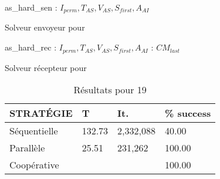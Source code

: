 \begin{algorithm}[!h]
\dontprintsemicolon
\SetNoline
{}
   as\_hard\_sen\;
\algoindent{} : $I_{perm}, T_{AS}, V_{AS}, S_{first}, A_{AI}$ \;
\caption{Solveur envoyeur pour \CARRP}\label{res_as:costas_sender}
\end{algorithm}

\begin{algorithm}[!h]
\dontprintsemicolon
\SetNoline
{}
   as\_hard\_rec\;
\algoindent{} : $I_{perm}, T_{AS}, V_{AS}, S_{first}, A_{AI}$ \; 
\algoindent{}: $CM_{last}$\;
\caption{Solveur récepteur pour \CARRP}\label{res_as:costas_receiver}
\end{algorithm}

\begin{table}[!h]
\captionsetup{belowskip=6pt,aboveskip=6pt}
\centering
\renewcommand{\arraystretch}{1}
\begin{tabular}{p{3.2cm}|R{1.2cm}R{1.7cm}R{1.7cm}}
	\hline
	{\bf STRATÉGIE} & T & It. & \% success\\
	\hline
	Séquentielle  & 132.73 & 2,332,088 & 40.00\\
	Parallèle & 25.51 & 231,262 & 100.00\\
	Coopérative &  &  & 100.00\\
	\hline
\end{tabular}
\caption{Résultats pour \CARRP{} 19}
\label{res_tab:costas19}
\end{table}

